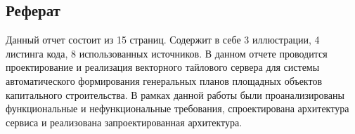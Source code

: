 \subsection*{\Large{Реферат}}
Данный отчет состоит из 15 страниц.
Содержит в себе 3 иллюстрации, 4 листинга кода, 8 использованных источников.
В данном отчете проводится проектирование и реализация векторного тайлового сервера
для системы автоматического формирования генеральных планов площадных объектов капитального строительства.
В рамках данной работы были проанализированы функциональные и нефункциональные требования, спроектирована
архитектура сервиса и реализована запроектированная архитектура.